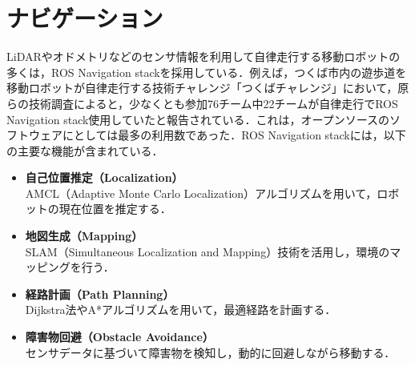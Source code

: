 
\section{ナビゲーション}\label{sec:navigation-stack}
LiDARやオドメトリなどのセンサ情報を利用して自律走行する移動ロボットの多くは，ROS Navigation stack\cite{nav1,nav2}を採用している．例えば，つくば市内の遊歩道を移動ロボットが自律走行する技術チャレンジ「つくばチャレンジ」において，原らの技術調査\cite{robomech2024-hara}によると，少なくとも参加76チーム中22チームが自律走行でROS Navigation stack使用していたと報告されている．これは，オープンソースのソフトウェアにとしては最多の利用数であった．ROS Navigation stackには，以下の主要な機能が含まれている．

\begin{itemize}
     \item \textbf{自己位置推定（Localization）}\\
     AMCL（Adaptive Monte Carlo Localization）アルゴリズムを用いて，ロボットの現在位置を推定する．
     \item \textbf{地図生成（Mapping）}\\
     SLAM（Simultaneous Localization and Mapping）技術を活用し，環境のマッピングを行う．
     \item \textbf{経路計画（Path Planning）}\\
     Dijkstra法\cite{dijkstra2022note}やA*アルゴリズム\cite{hart1968formal-astar}を用いて，最適経路を計画する．
     \item \textbf{障害物回避（Obstacle Avoidance）}\\
     センサデータに基づいて障害物を検知し，動的に回避しながら移動する．
\end{itemize}

\newpage
